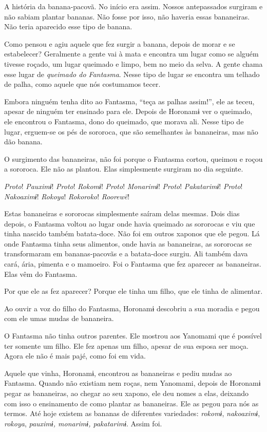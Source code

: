 A história da banana-pacovã. No início era assim. Nossos antepassados
surgiram e não sabiam plantar bananas. Não fosse por isso, não haveria
essas bananeiras. Não teria aparecido esse tipo de banana. 

Como pensou e agiu aquele que fez surgir a banana, depois de morar e se
estabelecer? Geralmente a gente vai à mata e encontra um lugar como se
alguém tivesse roçado, um lugar queimado e limpo, bem no meio da selva.
A gente chama esse lugar de \textit{queimado do Fantasma}. Nesse tipo de
lugar se encontra um telhado de palha, como aquele que nós costumamos
tecer. 

Embora ninguém tenha dito ao Fantasma, ``teça as palhas assim!'', ele as
teceu, apesar de ninguém ter ensinado para ele. Depois de Horonamɨ ver o
queimado, ele encontrou o Fantasma, dono do queimado, que morava ali.
Nesse tipo de lugar, erguem-se os pés de sororoca, que são semelhantes
às bananeiras, mas não dão banana. 

O surgimento das bananeiras, não foi porque o Fantasma cortou, queimou e
roçou a sororoca. Ele não as plantou. Elas simplesmente surgiram no dia
seguinte. 

\textit{Proto}! \textit{Pauximɨ}! \textit{Proto}! \textit{Rokomɨ}! \textit{Proto}! \textit{Monarimɨ}!
\textit{Proto}! \textit{Pakatarimɨ}!
\textit{Proto}! \textit{Nakoaximɨ}! \textit{Rokoya}! \textit{Rokoroko}! \textit{Roorewë}! 

Estas bananeiras e sororocas simplesmente saíram delas mesmas. Dois dias depois, o Fantasma voltou ao lugar onde havia queimado as sororocas e viu que tinha nascido
também batata-doce. Não foi em outros xaponos que ele pegou. Lá onde
Fantasma tinha seus alimentos, onde havia as bananeiras, as sororocas se
transformaram em bananas-pacovãs e a batata-doce surgiu. Ali também dava
cará, ária, pimenta e o mamoeiro. Foi o Fantasma que fez aparecer as
bananeiras. Elas vêm do Fantasma. 

Por que ele as fez aparecer? Porque ele tinha um filho, que ele tinha de
alimentar. 

Ao ouvir a voz do filho do Fantasma, Horonamɨ descobriu a sua moradia e
pegou com ele umas mudas de bananeira. 

O Fantasma não tinha outros parentes. Ele mostrou aos Yanomami que é
possível ter somente um filho. Ele fez apenas um filho, apesar de sua
esposa ser moça. Agora ele não é mais pajé, como foi em vida. 

Aquele que vinha, Horonamɨ, encontrou as bananeiras e pediu mudas ao
Fantasma. Quando não existiam nem roças, nem Yanomami, depois de
Horonamɨ pegar as bananeiras, ao chegar ao seu xapono, ele deu nomes a
elas, deixando com isso o ensinamento de como plantar as bananeiras. Ele
as pegou para nós as termos. Até hoje existem as bananas de diferentes
variedades: \textit{rokomɨ}, \textit{nakoaximɨ}, \textit{rokoya}, \textit{pauximɨ,
monarimɨ, pakatarimɨ}. Assim foi. 

